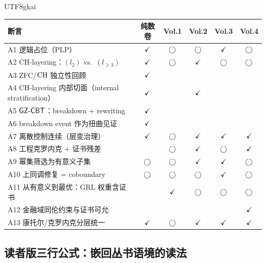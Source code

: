 \documentclass[12pt]{article}
\begin{document}
\begin{CJK*}{UTF8}{gkai}
\begin{center}
\small
\setlength{\tabcolsep}{4pt}
\renewcommand{\arraystretch}{1.2}
\begin{tabular}{p{}ccccc}
\hline
断言 & 纯数卷 & Vol.1 & Vol.2 & Vol.3 & Vol.4 \\
\hline
A1 逻辑占位（PLP） & $\checkmark$ & $\bigcirc$ & $\bigcirc$ & $\checkmark$ & $\bigcirc$ \\
A2 CH-layering：$(l_2)$ vs.\ $(l_{\ge3})$ & $\checkmark$ & $\bigcirc$ & $\checkmark$ & $\bigcirc$ & $\bigcirc$
  \\
A3 ZFC/$\mathrm{CH}$ 独立性回顾 & $\checkmark$ &  &  &  &  \\
A4 CH-layering 内部切面（internal stratification） & $\checkmark$ &  & $\checkmark$ &  &  \\
A5 $\mathsf{GZ\text{-}CBT}$：breakdown + rewriting & $\checkmark$ &  &  &  &  \\
A6 breakdown event 作为扭曲见证 & $\checkmark$ &  &  &  &  \\
A7 离散控制连续（层变治理） & $\checkmark$ & $\bigcirc$ & $\checkmark$ & $\checkmark$ & $\checkmark$ \\
A8 工程克罗内克 + 证书残差 &  & $\bigcirc$ & $\checkmark$ & $\bigcirc$ & $\checkmark$ \\
A9 幂集筛选为有意义子集 & $\bigcirc$ & $\bigcirc$ & $\checkmark$ & $\checkmark$ & $\bigcirc$ \\
A10 上同调修复 = coboundary & $\bigcirc$ & $\bigcirc$ & $\bigcirc$ & $\checkmark$ & $\bigcirc$ \\
A11 从有意义到最优：GRL 权重含证书 &  & $\checkmark$ & $\bigcirc$ & $\bigcirc$ & $\bigcirc$ \\
A12 金融域同伦约束与证书可允 &  &  &  &  & $\checkmark$ \\
A13 康托尔/克罗内克分层统一 & $\checkmark$ & $\bigcirc$ & $\checkmark$ & $\checkmark$ & $\checkmark$ \\
\hline
\end{tabular}
\end{center}

\subsection{读者版三行公式：嵌回丛书语境的读法}


\end{CJK*}
\end{document}
